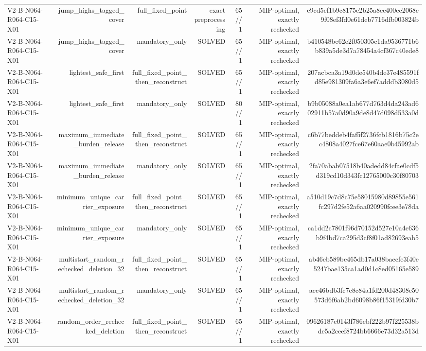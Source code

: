 {\begin{longtable}{lrrrrrr}
V2-B-N064-R064-C15-X01 & jump\_highs\_tagged\_cover & full\_fixed\_point & exact preprocessing & 65//1 & MIP-optimal, exactly rechecked & e9cd5cf1b9c8175e2b25a8ee400ec2068c9f08ef3fd0e61deb7716dfb003824b \\
V2-B-N064-R064-C15-X01 & jump\_highs\_tagged\_cover & mandatory\_only & SOLVED & 65//1 & MIP-optimal, exactly rechecked & b410548be62e2f050305c1da9536771b6b839a5de3d7a78454a4cf367c40ede8 \\
V2-B-N064-R064-C15-X01 & lightest\_safe\_first & full\_fixed\_point\_then\_reconstruct & SOLVED & 65//1 & MIP-optimal, exactly rechecked & 207acbca3a19d0de540b4de37e485591fd85e981309fa6a3e6ef7adddb3080d5 \\
V2-B-N064-R064-C15-X01 & lightest\_safe\_first & mandatory\_only & SOLVED & 80//1 & MIP-optimal, exactly rechecked & b9b05088a0ea1ab677d763d4da243ad602911b57a0d90a9de8d47d098d533a0d \\
V2-B-N064-R064-C15-X01 & maximum\_immediate\_burden\_release & full\_fixed\_point\_then\_reconstruct & SOLVED & 65//1 & MIP-optimal, exactly rechecked & c6b77beddeb4faf5f2736fcb1816b75c2ec4808a4027fce67e60aae0b45992ab \\
V2-B-N064-R064-C15-X01 & maximum\_immediate\_burden\_release & mandatory\_only & SOLVED & 65//1 & MIP-optimal, exactly rechecked & 2fa70abab07518b40adedd84cfae0cdf5d319cd10d343fc12765000c30f80703 \\
V2-B-N064-R064-C15-X01 & minimum\_unique\_carrier\_exposure & full\_fixed\_point\_then\_reconstruct & SOLVED & 65//1 & MIP-optimal, exactly rechecked & a510d19c7d8c75e58015980d89855e561fc297d2fe52a6aa020990fcee3e78da \\
V2-B-N064-R064-C15-X01 & minimum\_unique\_carrier\_exposure & mandatory\_only & SOLVED & 65//1 & MIP-optimal, exactly rechecked & ca1dd2c7801f96d70152d527e10a4c636b9f4bd7ca295d3cf8f01ad82693eab5 \\
V2-B-N064-R064-C15-X01 & multistart\_random\_rechecked\_deletion\_32 & full\_fixed\_point\_then\_reconstruct & SOLVED & 65//1 & MIP-optimal, exactly rechecked & ab46eb589be465db17a038baecfe3f40e5247bae135ca1ad0d1c8ed05165e589 \\
V2-B-N064-R064-C15-X01 & multistart\_random\_rechecked\_deletion\_32 & mandatory\_only & SOLVED & 65//1 & MIP-optimal, exactly rechecked & aec46bdb3fc7e8c84a1fd200d48308e50573d6f6ab2bd6098b86f15319fd30b7 \\
V2-B-N064-R064-C15-X01 & random\_order\_rechecked\_deletion & full\_fixed\_point\_then\_reconstruct & SOLVED & 65//1 & MIP-optimal, exactly rechecked & 09626187e0143f786ebf222b97f225538bde5a2ceef8724bb6666e73d32a513d \\

\end{longtable}}
